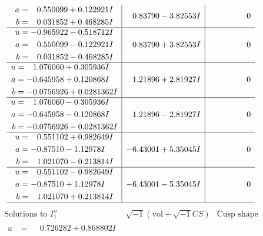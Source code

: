 \documentclass[1p]{elsarticle_modified}
\theoremstyle{definition}
\newcommand{\I}{\sqrt{-1}}
\begin{document}
$$\begin{array}{c|c|c}
\begin{aligned}
a &= \phantom{-}0.550099 + 0.122921 I \\
b &= \phantom{-}0.031852 + 0.468285 I\end{aligned}
 & \phantom{-}0.83790 - 3.82553 I & \phantom{-0.000000 } 0 \\ \hline\begin{aligned}
u &= -0.965922 - 0.518712 I \\
a &= \phantom{-}0.550099 - 0.122921 I \\
b &= \phantom{-}0.031852 - 0.468285 I\end{aligned}
 & \phantom{-}0.83790 + 3.82553 I & \phantom{-0.000000 } 0 \\ \hline\begin{aligned}
u &= \phantom{-}1.076060 + 0.305936 I \\
a &= -0.645958 + 0.120868 I \\
b &= -0.0756926 + 0.0281362 I\end{aligned}
 & \phantom{-}1.21896 + 2.81927 I & \phantom{-0.000000 } 0 \\ \hline\begin{aligned}
u &= \phantom{-}1.076060 - 0.305936 I \\
a &= -0.645958 - 0.120868 I \\
b &= -0.0756926 - 0.0281362 I\end{aligned}
 & \phantom{-}1.21896 - 2.81927 I & \phantom{-0.000000 } 0 \\ \hline\begin{aligned}
u &= \phantom{-}0.551102 + 0.982649 I \\
a &= -0.87510 - 1.12978 I \\
b &= \phantom{-}1.021070 - 0.213814 I\end{aligned}
 & -6.43001 + 5.35045 I & \phantom{-0.000000 } 0 \\ \hline\begin{aligned}
u &= \phantom{-}0.551102 - 0.982649 I \\
a &= -0.87510 + 1.12978 I \\
b &= \phantom{-}1.021070 + 0.213814 I\end{aligned}
 & -6.43001 - 5.35045 I & \phantom{-0.000000 } 0\\
 \hline 
 \end{array}$$\newpage$$\begin{array}{c|c|c}  
\text{Solutions to }I^u_{1}& \I (\text{vol} + \sqrt{-1}CS) & \text{Cusp shape}\\
 \hline 
\begin{aligned}
u &= \phantom{-}0.726282 + 0.868802 I \\

\end{aligned}
\end{array}$$
\end{document}
